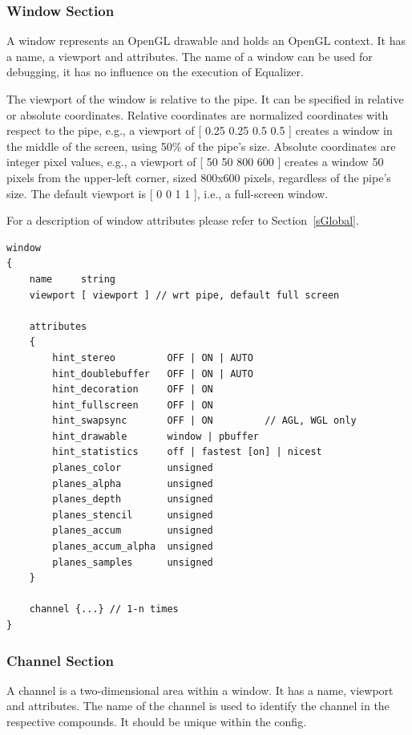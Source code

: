 \documentclass[10pt,a4]{scrartcl}
\newcommand{\sref}[1]{Section~\ref{#1}}
\begin{document}
\subsubsection{Window Section}

A window represents an OpenGL drawable and holds an OpenGL context. It
has a name, a viewport and attributes. The name of a window can be used
for debugging, it has no influence on the execution of Equalizer.

The viewport of the window is relative to the pipe. It can be specified
in relative or absolute coordinates. Relative coordinates are normalized
coordinates with respect to the pipe, e.g., a viewport of \textsf{[ 0.25
  0.25 0.5 0.5 ]} creates a window in the middle of the screen, using
50\% of the pipe's size. Absolute coordinates are integer pixel values,
e.g., a viewport of \textsf{[ 50 50 800 600 ]} creates a window 50 pixels
from the upper-left corner, sized 800x600 pixels, regardless of the
pipe's size. The default viewport is \textsf{[ 0 0 1 1 ]}, i.e., a
full-screen window. 

For a description of window attributes please refer to \sref{sGlobal}.

{\footnotesize\begin{lstlisting}
window
{
    name     string
    viewport [ viewport ] // wrt pipe, default full screen

    attributes
    {
        hint_stereo         OFF | ON | AUTO
        hint_doublebuffer   OFF | ON | AUTO
        hint_decoration     OFF | ON
        hint_fullscreen     OFF | ON
        hint_swapsync       OFF | ON         // AGL, WGL only
        hint_drawable       window | pbuffer
        hint_statistics     off | fastest [on] | nicest
        planes_color        unsigned
        planes_alpha        unsigned
        planes_depth        unsigned
        planes_stencil      unsigned
        planes_accum        unsigned
        planes_accum_alpha  unsigned
        planes_samples      unsigned
    }

    channel {...} // 1-n times
}
\end{lstlisting}}

\subsubsection{Channel Section}

A channel is a two-dimensional area within a window. It has a name,
viewport and attributes. The name of the channel is used to identify the
channel in the respective compounds. It should be unique within the config.
\end{document}
